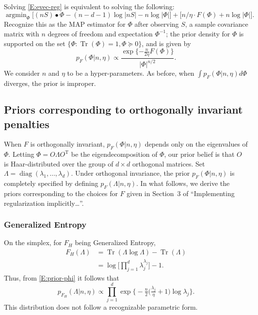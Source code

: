 \documentclass{article}
\newcommand{\trans}{\mathrm{T}}
\DeclareMathOperator*{\Tr}{Tr}
\DeclareMathOperator*{\diag}{diag}
\DeclareMathOperator*{\argmin}{argmin}
\begin{document}
Solving \eqref{E:evec-reg} is equivalent to solving the following:
\begin{equation*}
    \argmin_{\Phi}
        \big[
            (n S) \bullet \Phi
            -
            (n-d-1) \log |n S|
            -
            n \log |\Phi|
        \big]
        +
        \big[
            n/\eta \cdot F(\Phi)
            +
            n \log |\Phi|
        \big].
\end{equation*}
Recognize this as the MAP estimator for $\Phi$ after observing $S$, a 
sample covariance matrix with $n$ degrees of freedom and expectation
$\Phi^{-1}$; the prior density for $\Phi$ is supported on the
set $\{ \Phi : \Tr(\Phi) = 1, \Phi \succeq 0\}$, and is given by
\begin{equation}\label{E:prior-phi}
    p_{F}(\Phi | n, \eta)
        \propto
        \frac{
            \exp\{-\tfrac{n}{2\eta} F(\Phi) \}
        }{
            |\Phi|^{n/2}
        }.
\end{equation}
We consider $n$ and $\eta$ to be a hyper-parameters.  As before, when
$\int p_{F}(\Phi | n, \eta) d\Phi$ diverges, the prior is improper.


\subsection{Priors corresponding to orthogonally invariant penalties}

When $F$ is orthogonally invariant, $p_F(\Phi | n, \eta)$ depends only on the
eigenvalues of $\Phi$.  Letting $\Phi = O \Lambda O^\trans$ be the
eigendecomposition of $\Phi$, our prior belief is that $O$ is Haar-distributed over
the group of $d\times d$ orthogonal matrices.  Set
$\Lambda = \diag(\lambda_1, \ldots, \lambda_d)$.  Under orthogonal invariance,
the prior $p_F(\Phi | n, \eta)$ is completely specified by defining
$p_F(\Lambda | n, \eta)$.  In what follows, we derive the priors corresponding
to the choices for $F$ given in Section~3 of ``Implementing regularization
implicitly\ldots''.

\subsubsection*{Generalized Entropy}

On the simplex, for $F_H$ being Generalized Entropy,
\begin{align*}
    F_H(\Lambda)
        &= \Tr(\Lambda \log \Lambda) - \Tr(\Lambda) \\
        &= \log \Big[ \prod_{j=1}^d \lambda_j^{\lambda_j} \Big] - 1.
\end{align*}
Thus, from \eqref{E:prior-phi} it follows that
\[
    p_{F_H}(\Lambda | n, \eta)
        \propto
            \prod_{j=1}^d
                \exp\Big\{
                    -\tfrac{n}{2}
                    \big(
                        \tfrac{\lambda_j}{\eta}
                        +
                        1
                    \big)
                    \log \lambda_j
                \Big\}.
\]
This distribution does not follow a recognizable parametric form.
\end{document}
